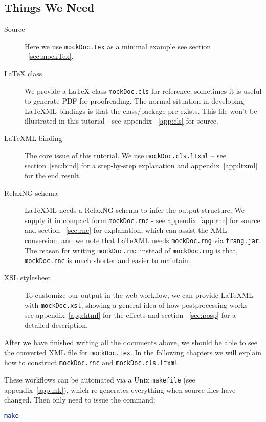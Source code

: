 \documentclass[a4paper]{article}
\def\latexml{{\LaTeX}ML\xspace}
\begin{document}
\subsection{Things We Need}
\begin{description}
\item[Source] Here we use \lstinline|mockDoc.tex| as a minimal example see section ~\ref{sec:mockTex}. \item[{\LaTeX} class] We provide a {\LaTeX} class \lstinline|mockDoc.cls| for reference; sometimes it is useful to generate PDF for proofreading. The  normal situation in
  developing \latexml bindings is that the class/package pre-exists. This file won't be
  illustrated in this tutorial - see appendix ~\ref{app:cls} for source.
\item[\latexml binding] The core issue of this tutorial. We use \lstinline|mockDoc.cls.ltxml|
  -- see section~\ref{sec:bind} for a step-by-step explanation and appendix~\ref{app:ltxml}
  for the end result.
\item[RelaxNG schema] \latexml needs a RelaxNG schema to infer the output structure. We
  supply it in compact form \lstinline|mockDoc.rnc| - see appendix~\ref{app:rnc} for source and section ~\ref{sec:rnc} for explanation, which
  can assist the XML conversion, and we note that \latexml needs \lstinline|mockDoc.rng| via
  \lstinline|trang.jar|.  The reason for writing \lstinline|mockDoc.rnc| instead of
  \lstinline|mockDoc.rng| is that, \lstinline|mockDoc.rnc| is much shorter and easier to
  maintain. 
\item[XSL stylesheet] To customize our output in the web workflow, we can provide \latexml with 
  \lstinline|mockDoc.xsl|, showing a general idea of how postprocessing works - see appendix~\ref{app:html}
  for the effects and section ~\ref{sec:posp} for a detailed description.
\end{description} 
After we have finished writing all the documents above, we should be able to see the converted XML file for \lstinline|mockDoc.tex|. In the following chapters we will explain how to construct \lstinline|mockDoc.rnc| and
\lstinline|mockDoc.cls.ltxml|


These workflows can be automated via a Unix \lstinline|makefile| (see
appendix~\ref{app:mk}), which re-generates everything when source files have changed. Then
only need to issue the command:
\begin{lstlisting}[language=bash]
make
\end{lstlisting}
\end{document}
